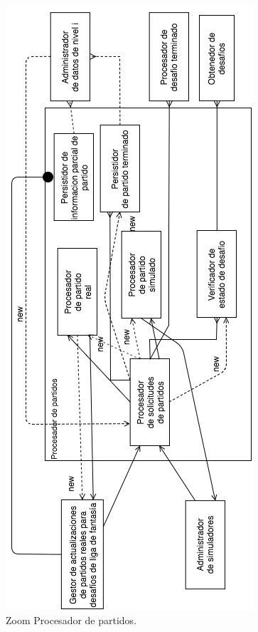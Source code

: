 
\begin{figure}[H]
  \centering
  \includegraphics[height=0.95\textheight]{reentrega/imagenes/desafios-5.png}
  \caption{Zoom Procesador de partidos.}
\end{figure}

